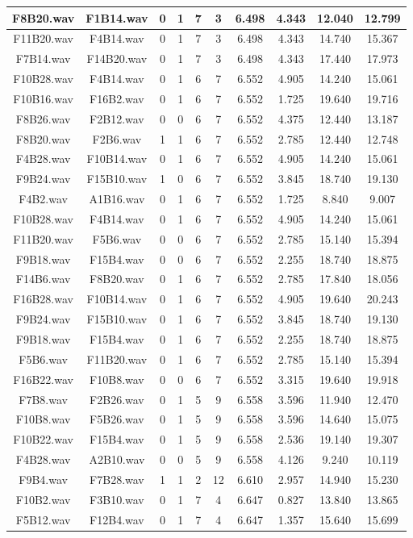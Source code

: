 \documentclass[11pt,a4paper]{book}
\begin{document}
\begin{longtable}[c]{|c|c|c|c|c|c|c|c|c|c|}
F8B20.wav&F1B14.wav&0&1&7&3&6.498&4.343&12.040&12.799\\ \hline
F11B20.wav&F4B14.wav&0&1&7&3&6.498&4.343&14.740&15.367\\ \hline
F7B14.wav&F14B20.wav&0&1&7&3&6.498&4.343&17.440&17.973\\ \hline
F10B28.wav&F4B14.wav&0&1&6&7&6.552&4.905&14.240&15.061\\ \hline
F10B16.wav&F16B2.wav&0&1&6&7&6.552&1.725&19.640&19.716\\ \hline
F8B26.wav&F2B12.wav&0&0&6&7&6.552&4.375&12.440&13.187\\ \hline
F8B20.wav&F2B6.wav&1&1&6&7&6.552&2.785&12.440&12.748\\ \hline
F4B28.wav&F10B14.wav&0&1&6&7&6.552&4.905&14.240&15.061\\ \hline
F9B24.wav&F15B10.wav&1&0&6&7&6.552&3.845&18.740&19.130\\ \hline
F4B2.wav&A1B16.wav&0&1&6&7&6.552&1.725&8.840&9.007\\ \hline
F10B28.wav&F4B14.wav&0&1&6&7&6.552&4.905&14.240&15.061\\ \hline
F11B20.wav&F5B6.wav&0&0&6&7&6.552&2.785&15.140&15.394\\ \hline
F9B18.wav&F15B4.wav&0&0&6&7&6.552&2.255&18.740&18.875\\ \hline
F14B6.wav&F8B20.wav&0&1&6&7&6.552&2.785&17.840&18.056\\ \hline
F16B28.wav&F10B14.wav&0&1&6&7&6.552&4.905&19.640&20.243\\ \hline
F9B24.wav&F15B10.wav&0&1&6&7&6.552&3.845&18.740&19.130\\ \hline
F9B18.wav&F15B4.wav&0&1&6&7&6.552&2.255&18.740&18.875\\ \hline
F5B6.wav&F11B20.wav&0&1&6&7&6.552&2.785&15.140&15.394\\ \hline
F16B22.wav&F10B8.wav&0&0&6&7&6.552&3.315&19.640&19.918\\ \hline
F7B8.wav&F2B26.wav&0&1&5&9&6.558&3.596&11.940&12.470\\ \hline
F10B8.wav&F5B26.wav&0&1&5&9&6.558&3.596&14.640&15.075\\ \hline
F10B22.wav&F15B4.wav&0&1&5&9&6.558&2.536&19.140&19.307\\ \hline
F4B28.wav&A2B10.wav&0&0&5&9&6.558&4.126&9.240&10.119\\ \hline
F9B4.wav&F7B28.wav&1&1&2&12&6.610&2.957&14.940&15.230\\ \hline
F10B2.wav&F3B10.wav&0&1&7&4&6.647&0.827&13.840&13.865\\ \hline
F5B12.wav&F12B4.wav&0&1&7&4&6.647&1.357&15.640&15.699\\ \hline

\end{longtable}
\end{document}
